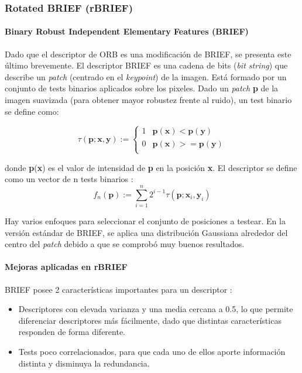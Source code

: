 \subsubsection{Rotated BRIEF (rBRIEF)}

\paragraph{Binary Robust Independent Elementary Features (BRIEF)}

Dado que el descriptor de ORB es una modificación de BRIEF, se presenta este último brevemente. El descriptor BRIEF\cite{Calonder12} es una cadena de bits (\textit{bit string}) que describe un \textit{patch} (centrado en el \textit{\textsl{keypoint}}) de la imagen. Está formado por un conjunto de tests binarios aplicados sobre los pixeles. Dado un \textit{patch} \textbf{p} de la imagen suavizada (para obtener mayor robustez frente al ruido), un test binario se define como:

\begin{equation}
\tau(\textbf{p}; \textbf{x}, \textbf{y}) := \left\lbrace
\begin{array}{cc}
1 & \textbf{p}(\textbf{x}) < \textbf{p}(\textbf{y}) \\
0 & \textbf{p}(\textbf{x}) >= \textbf{p}(\textbf{y}) \\
\end{array}
\right.
\end{equation}

donde \textbf{p}(\textbf{x}) es el valor de intensidad de \textbf{p} en la posición \textbf{x}.
El descriptor se define como un vector de n tests binarios :
\begin{equation}
f_{n}(\textbf{p}) := \sum_{i=1}^{n} 2^{i-1}\tau(\textbf{p}; \textbf{x}_{i}, \textbf{y}_{i})
\end{equation}

Hay varios enfoques para seleccionar el conjunto de posiciones a testear. En la versión estándar de BRIEF, se aplica una distribución Gaussiana alrededor del centro del \textit{patch} debido a que se comprobó muy buenos resultados.

\paragraph{Mejoras aplicadas en rBRIEF}

BRIEF posee 2 características importantes para un descriptor :
\begin{itemize}

\item Descriptores con elevada varianza y una media cercana a 0.5, lo que permite diferenciar descriptores más fácilmente, dado que distintas características responden de forma diferente.

\item Tests poco correlacionados, para que cada uno de ellos aporte información distinta y disminuya la redundancia.

\end{itemize}

